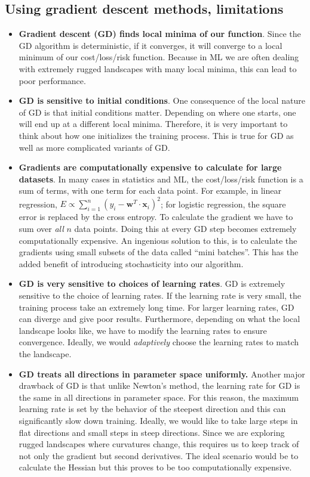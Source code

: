 \documentclass[%
oneside,                 %
final,                   %
10pt]{article}
\begin{document}
\subsection*{Using gradient descent methods, limitations}

\begin{itemize}
\item \textbf{Gradient descent (GD) finds local minima of our function}. Since the GD algorithm is deterministic, if it converges, it will converge to a local minimum of our cost/loss/risk function. Because in ML we are often dealing with extremely rugged landscapes with many local minima, this can lead to poor performance.

\item \textbf{GD is sensitive to initial conditions}. One consequence of the local nature of GD is that initial conditions matter. Depending on where one starts, one will end up at a different local minima. Therefore, it is very important to think about how one initializes the training process. This is true for GD as well as more complicated variants of GD.

\item \textbf{Gradients are computationally expensive to calculate for large datasets}. In many cases in statistics and ML, the cost/loss/risk function is a sum of terms, with one term for each data point. For example, in linear regression, $E \propto \sum_{i=1}^n (y_i - \mathbf{w}^T\cdot\mathbf{x}_i)^2$; for logistic regression, the square error is replaced by the cross entropy. To calculate the gradient we have to sum over \emph{all} $n$ data points. Doing this at every GD step becomes extremely computationally expensive. An ingenious solution to this, is to calculate the gradients using small subsets of the data called ``mini batches''. This has the added benefit of introducing stochasticity into our algorithm.

\item \textbf{GD is very sensitive to choices of learning rates}. GD is extremely sensitive to the choice of learning rates. If the learning rate is very small, the training process take an extremely long time. For larger learning rates, GD can diverge and give poor results. Furthermore, depending on what the local landscape looks like, we have to modify the learning rates to ensure convergence. Ideally, we would \emph{adaptively} choose the learning rates to match the landscape.

\item \textbf{GD treats all directions in parameter space uniformly.} Another major drawback of GD is that unlike Newton's method, the learning rate for GD is the same in all directions in parameter space. For this reason, the maximum learning rate is set by the behavior of the steepest direction and this can significantly slow down training. Ideally, we would like to take large steps in flat directions and small steps in steep directions. Since we are exploring rugged landscapes where curvatures change, this requires us to keep track of not only the gradient but second derivatives. The ideal scenario would be to calculate the Hessian but this proves to be too computationally expensive. 


\end{itemize}
\end{document}
